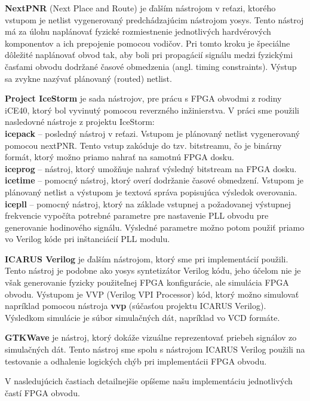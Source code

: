 \textbf{NextPNR} (Next Place and Route) \cite{nextpnr} je ďalším nástrojom v reťazi, ktorého vstupom je netlist vygenerovaný predchádzajúcim nástrojom yosys. Tento nástroj má za úlohu naplánovať fyzické rozmiestnenie jednotlivých hardvérových komponentov a ich prepojenie pomocou vodičov. Pri tomto kroku je špeciálne dôležité naplánovať obvod tak, aby boli pri propagácií signálu medzi fyzickými časťami obvodu dodržané časové obmedzenia (angl. timing constraints). Výstup sa zvykne nazývať plánovaný (routed) netlist.

\textbf{Project IceStorm} \cite{icestorm} je sada nástrojov, pre prácu s FPGA obvodmi z rodiny iCE40, ktorý bol vyvinutý pomocou reverzného inžinierstva. V práci sme použili nasledovné nástroje z projektu IceStorm:\\
\textbf{icepack} -- posledný nástroj v  reťazi. Vstupom je plánovaný netlist vygenerovaný pomocou nextPNR. Tento vstup zakóduje do tzv. bitstreamu, čo je binárny formát, ktorý možno priamo nahrať na samotnú FPGA dosku.\\
\textbf{iceprog} -- nástroj, ktorý umožňuje nahrať výsledný bitstream na FPGA dosku.\\
\textbf{icetime} -- pomocný nástroj, ktorý overí dodržanie časové obmedzení. Vstupom je plánovaný netlist a výstupom je textová správa popisujúca výsledok overovania.\\
\textbf{icepll} -- pomocný nástroj, ktorý na základe vstupnej a požadovanej výstupnej frekvencie vypočíta potrebné parametre pre nastavenie PLL obvodu pre generovanie hodinového signálu. Výsledné parametre možno potom použiť priamo vo Verilog kóde pri inštanciácií PLL modulu.

\textbf{ICARUS Verilog} \cite{iverilog} je ďalším nástrojom, ktorý sme pri implementácií použili. Tento nástroj je podobne ako yosys syntetizátor Verilog kódu, jeho účelom nie je však generovanie fyzicky použiteľnej FPGA konfigurácie, ale simulácia FPGA obvodu. Výstupom je VVP (Verilog VPI Processor) kód, ktorý možno simulovať napríklad pomocou nástroja \textbf{vvp} (súčasťou projektu ICARUS Verilog). Výsledkom simulácie je súbor simulačných dát, napríklad vo VCD formáte.

\textbf{GTKWave} \cite{gtkwave} je nástroj, ktorý dokáže vizuálne reprezentovať priebeh signálov zo simulačných dát. Tento nástroj sme spolu s nástrojom ICARUS Verilog použili na testovanie a odhalenie logických chýb pri implementácii FPGA obvodu.

V nasledujúcich častiach detailnejšie opíšeme našu implementáciu jednotlivých častí FPGA obvodu.

